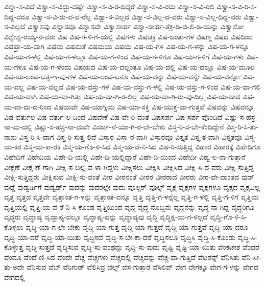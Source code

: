 {ವಿಶ್ವಾ-ಸ-ವಿದೆ
ವಿಶ್ವಾ-ಸ-ವಿದ್ದು-ದಷ್ಟೇ
ವಿಶ್ವಾ-ಸ-ವಿ-ರ-ದಿದ್ದರೆ
ವಿಶ್ವಾ-ಸ-ವಿ-ರದು
ವಿಶ್ವಾ-ಸ-ವಿ-ರಲಿ
ವಿಶ್ವಾ-ಸ-ವಿ-ರಿ-ಸ-ದಿದ್ದ-ವರೂ
ವಿಶ್ವಾ-ಸ-ವಿ-ರು-ವ-ವ-ರೆಲ್ಲ
ವಿಶ್ವಾ-ಸ-ವಿಲ್ಲದ
ವಿಶ್ವಾ-ಸ-ವಿಲ್ಲ-ದ-ವರು
ವಿಶ್ವಾ-ಸ-ವಿಲ್ಲ-ದಿದ್ದ-ವರು
ವಿಶ್ವಾ-ಸ-ವಿಲ್ಲದೆ
ವಿಶ್ವಾಸವು
ವಿಶ್ವಾಸವೂ
ವಿಶ್ವಾಸವೇ
ವಿಶ್ವಾಸಾರ್ಹ
ವಿಶ್ವಾ-ಸಾರ್ಹ-ತೆಕ್ರಿ-ಡಿ-ಬಿ-ಲಿ-ಡಿ-ಯನ್ನು
ವಿಶ್ವಾಸೋ
ವಿಶ್ವೇಶ್ವ-ರಯ್ಯ-ನ-ವರು
ವಿಷ
ವಿಷ-ಗ-ಳಿ-ಗೆ-ಯಲ್ಲಿ
ವಿಷಗಳು
ವಿಷಚಕ್ರ
ವಿಷ-ಜಂತು-ಗಳ
ವಿಷಣ್ಣ
ವಿಷದ
ವಿಷದಿಂದ
ವಿಷಪ್ರಾ-ಯ-ವಾಗಿ
ವಿಷಮ
ವಿಷಮತೆ
ವಿಷಮಯ
ವಿಷಯ
ವಿಷ-ಯ-ಗಳ
ವಿಷ-ಯ-ಗ-ಳನ್ನು
ವಿಷ-ಯ-ಗ-ಳನ್ನೂ
ವಿಷ-ಯ-ಗ-ಳಲ್ಲಿ
ವಿಷ-ಯ-ಗ-ಳಲ್ಲೂ
ವಿಷ-ಯ-ಗ-ಳಿಂದ
ವಿಷ-ಯ-ಗ-ಳಿಗೂ
ವಿಷ-ಯ-ಗ-ಳಿಗೆ
ವಿಷ-ಯ-ಗಳು
ವಿಷ-ಯ-ಗಳೂ
ವಿಷ-ಯ-ಗ-ಳೆಂದು
ವಿಷಯದ
ವಿಷ-ಯ-ದಲ್ಲಂತೂ
ವಿಷ-ಯ-ದಲ್ಲಿ
ವಿಷ-ಯ-ದಲ್ಲೂ
ವಿಷ-ಯ-ಮೂಲ
ವಿಷ-ಯ-ಲಂಪ-ಟತ್ವ-ಇ-ವು-ಗಳ
ವಿಷ-ಯ-ಲಂಪ-ಟನೂ
ವಿಷ-ಯ-ವನ್ನು
ವಿಷ-ಯ-ವನ್ನೇ
ವಿಷ-ಯ-ವನ್ನೋ
ವಿಷ-ಯ-ವಲ್ಲ
ವಿಷ-ಯ-ವಲ್ಲವೆ
ವಿಷ-ಯ-ವಸ್ತು-ಗಳ
ವಿಷ-ಯ-ವಸ್ತು-ಗ-ಳಲ್ಲಿ
ವಿಷ-ಯ-ವಸ್ತು-ಗ-ಳಿಂದ
ವಿಷ-ಯ-ವಾ-ಗಲಿ
ವಿಷ-ಯ-ವಾಗಿ
ವಿಷ-ಯ-ವಾ-ಗಿತ್ತು
ವಿಷ-ಯ-ವಾ-ಗಿ-ರ-ಲಿಲ್ಲ
ವಿಷ-ಯ-ವಾ-ಗಿ-ರು-ವು-ದಿಲ್ಲ
ವಿಷ-ಯ-ವಾದ
ವಿಷ-ಯ-ವಾ-ದು-ದ-ರಿಂದ
ವಿಷಯವೇ
ವಿಷ-ಯಾಗ್ನಿಯ
ವಿಷ-ಯಾ-ಸಕ್ತಿ
ವಿಷ-ಯುಕ್ತ-ವಾ-ಗುತ್ತವೆ
ವಿಷವನ್ನು
ವಿಷವನ್ನೂ
ವಿಷ-ವರ್ತುಲ
ವಿಷ-ವರ್ತು-ಲ-ದಿಂದ
ವಿಷವೇಕೆ
ವಿಷ-ವೇ-ರಿ-ದಂತೆ
ವಿಷಸರ್ಪ
ವಿಷ-ಸರ್ಪ-ವೊಂದಿದೆ
ವಿಷ್ಣು-ಸ-ಹಸ್ರ-ನಾ-ಮ-ದಲ್ಲಿ
ವಿಷ್ಣು-ಸ-ಹಸ್ರ-ನಾ-ಮವೇ
ವಿಸರ್ಜ-ನೆ-ಯಾ-ಗಿ-ರ-ಲೇ-ಬೇಕು
ವಿಸ್ತ-ರಿ-ಸ-ಬೇ-ಕೆಂದಿದ್ದೇನೆ
ವಿಸ್ತ-ರಿ-ಸಿ-ತು-ನಾನು
ವಿಸ್ತ-ರಿ-ಸಿ-ದಾಗ
ವಿಸ್ತ-ರಿ-ಸುತ್ತ-ಲಿದೆ
ವಿಸ್ತಾರ
ವಿಸ್ತಾ-ರ-ವಾಗಿ
ವಿಸ್ತಾರವೂ
ವಿಸ್ತೃತ
ವಿಸ್ತೃ-ತ-ವಾಗಿ
ವಿಸ್ತೃತವೂ
ವಿಸ್ಮ-ಯ-ಕರ
ವಿಸ್ಮ-ಯ-ಕಾ-ರಕ
ವಿಸ್ಮ-ಯ-ಗೊ-ಳಿ-ಸಿದ
ವಿಸ್ಮ-ಯ-ವೆ-ನಿ-ಸಿದ
ವಿಹ-ರಿ-ಸುತ್ತಿದ್ದ
ವಿಹಾರ
ವಿಹಾರಕ್ಕೆ
ವಿಹೇದಿಗೂ
ವಿಹೇದಿಗೆ
ವಿಹೇದಿಯ
ವಿಹೇ-ದಿ-ಯಲ್ಲಿ
ವಿಹೇ-ದಿ-ಯಲ್ಲಿದ್ದಾರೆ
ವಿಹೇ-ದಿ-ಯಿಂದ
ವಿಹೇದೀ
ವಿಹ್ವ-ಲ-ನಾ-ಗುತ್ತಾನೆ
ವೀಕ್ಷಣೆ
ವೀಕ್ಷ-ಣೆ-ಗಾಗಿ
ವೀಕ್ಷಿ-ಸ-ಬಲ್ಲ-ವ-ಳಾ-ಗಿದ್ದಳು
ವೀಕ್ಷಿಸಲು
ವೀಕ್ಷಿಸಿ
ವೀಕ್ಷಿಸಿದ
ವೀಕ್ಷಿ-ಸಿ-ದ-ವರು
ವೀಕ್ಷಿ-ಸುತ್ತಿದ್ದ
ವೀಕ್ಷಿ-ಸುತ್ತಿದ್ದರು
ವೀಕ್ಷಿಸುವ
ವೀಕ್ಷಿ-ಸು-ವಂತೆ
ವೀರ
ವೀರನಂತೆ
ವೀರರ
ವೀರರಾದ
ವೀರರು
ವೀರ-ವೇ-ದಾಂತದ
ವುಡ್
ವುಡ್ಡೆ
ವುಡ್ವರ್ಡಿಗೆ
ವುಡ್ವರ್ಡ್
ವುದನ್ನು
ವುದರಲ್ಲೇ
ವುದು
ವೂಲ್ಗರ್
ವೂಲ್ಫ್
ವೃಕ್ಷ
ವೃಕ್ಷಗಳ
ವೃಕ್ಷಗಳೂ
ವೃಕ್ಷದ
ವೃಕ್ಷವಿಲ್ಲ
ವೃತ್ತ
ವೃತ್ತದ
ವೃತ್ತವೇ
ವೃತ್ತಾಂತ-ಗ-ಳನ್ನು
ವೃತ್ತಾಂತ-ವನ್ನೂ
ವೃತ್ತಿ
ವೃತ್ತಿ-ಗ-ಳನ್ನೆಲ್ಲ
ವೃತ್ತಿ-ಗ-ಳಲ್ಲಿ
ವೃತ್ತಿ-ಗ-ಳಿಗೆ
ವೃತ್ತಿಯ
ವೃತ್ತಿಯಲ್ಲಿ
ವೃತ್ತಿ-ಯ-ವ-ರೆ-ನಿ-ಸಿ-ಕೊಂಡ
ವೃತ್ತಿಯಿಂದ
ವೃದ್ಧ
ವೃದ್ಧ-ನೊಬ್ಬನು
ವೃದ್ಧನನ್ನು
ವೃದ್ಧ-ನಾ-ಗಿದ್ದ
ವೃದ್ಧರಿಗೂ
ವೃದ್ಧರು
ವೃದ್ಧಾಪ್ಯ
ವೃದ್ಧಾಪ್ಯ-ದಲ್ಲೂ
ವೃದ್ಧಾಪ್ಯ-ವನ್ನು
ವೃದ್ಧಾಪ್ಯವು
ವೃದ್ಧಿ
ವೃದ್ಧಿಕ್ಷ-ಯ-ಗ-ಳಿಲ್ಲದೆ
ವೃದ್ಧಿ-ಗೊ-ಳಿ-ಸಿ-ಕೊಳ್ಳಲು
ವೃದ್ಧಿ-ಯಾ-ಗ-ಲೇ-ಬೇಕು
ವೃದ್ಧಿ-ಯಾ-ಗುತ್ತ
ವೃದ್ಧಿ-ಯಾ-ಗುತ್ತದೆ
ವೃದ್ಧಿ-ಯಾ-ಗುತ್ತವೆ
ವೃದ್ಧಿ-ಯಾ-ದರೂ
ವೃದ್ಧಿ-ಯಾ-ದರೆ
ವೃದ್ಧಿ-ಯಾ-ಯಿತು
ವೃದ್ಧಿಸದೆ
ವೃದ್ಧಿ-ಸ-ಬೇ-ಕಾ-ದರೆ
ವೃದ್ಧಿಸಲೂ
ವೃದ್ಧಿಸಿ
ವೃದ್ಧಿ-ಸಿ-ಕೊಂಡು
ವೃದ್ಧಿ-ಸಿ-ಕೊಳ್ಳುತ್ತ
ವೃದ್ಧಿ-ಸುತ್ತದೆ
ವೃದ್ಧಿಸುವ
ವೃದ್ಧಿ-ಸು-ವಂಥದ್ದು
ವೃದ್ಧಿ-ಸು-ವುದು
ವೃಷ್ಟಿ
ವೃಷ್ಟಿ-ಯಾ-ಯಿತು
ವೆಂಕಟೇಶ
ವೆಂದರೆ
ವೆಂದೂ
ವೆಂದೆ-ಣಿ-ಸಿದ
ವೆಂದೇ
ವೆಚ್ಚ
ವೆಚ್ಚಗಳು
ವೆಚ್ಚದಲ್ಲಿ
ವೆಚ್ಚವನ್ನು
ವೆಚ್ಚ-ವಾ-ಗುತ್ತಿದೆ
ವೆಟರನ್ಸ್
ವೆನಿಸಿತು
ವೆನಿ-ಸೀ-ತು-ಅದೇ
ವೆನಿಸುವ
ವೆಬ್
ವೆರಿಗುಡ್
ವೆಲಿಸಿವ್ರ
ವೆಲ್ಸ್
ವೆಸ-ಗುತ್ತಾರೆ
ವೆಸಿಲಿವ್
ವೇಗ
ವೇಗಕ್ಕೂ
ವೇಗ-ಗ-ಳನ್ನು
ವೇಗದ
ವೇಗದಲ್ಲಿ
}
